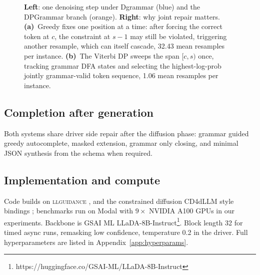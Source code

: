 \begin{figure}[t]
\begin{minipage}[c]{0.43\linewidth}
\end{minipage}
\caption{\label{fig:dp-denoise}%
  \textbf{Left}: one denoising step under Dgrammar (blue) and the DPGrammar branch (orange).
  \textbf{Right}: why joint repair matters.
  \textbf{(a)}~Greedy fixes one position at a time: after forcing the correct token at $c$,
  the constraint at $s{-}1$ may still be violated, triggering another resample, which
  can itself cascade, 32.43 mean resamples per instance.
  \textbf{(b)}~The Viterbi DP sweeps the span $[c,s)$ once, tracking grammar DFA
  states and selecting the highest-log-prob jointly grammar-valid token sequence, 1.06
  mean resamples per instance.}
\end{figure}

\subsection{Completion after generation}
Both systems share driver side repair after the diffusion phase: grammar guided greedy autocomplete, masked extension, grammar only closing, and minimal JSON synthesis from the schema when required.

\subsection{Implementation and compute}
Code builds on \textsc{llguidance} \citep{microsoft2025llguidance}, and the constrained diffusion CD4dLLM style bindings \citep{cd4dllm, zhang2026lookaheadthenverifyreliableconstraineddecoding}; benchmarks run on Modal with $9\times$ NVIDIA A100 GPUs in our experiments. Backbone is GSAI ML LLaDA-8B-Instruct\footnote{https://huggingface.co/GSAI-ML/LLaDA-8B-Instruct}. Block length 32 for timed async runs, remasking low confidence, temperature 0.2 in the driver. Full hyperparameters are listed in Appendix~\ref{app:hyperparams}.

